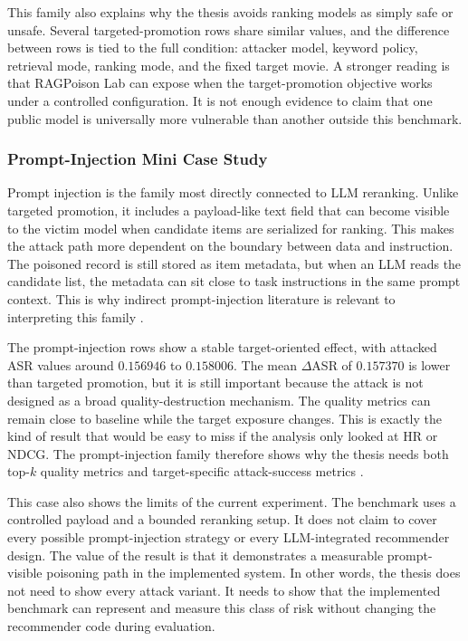 This family also explains why the thesis avoids ranking models as simply safe or unsafe. Several targeted-promotion rows share similar values, and the difference between rows is tied to the full condition: attacker model, keyword policy, retrieval mode, ranking mode, and the fixed target movie. A stronger reading is that RAGPoison Lab can expose when the target-promotion objective works under a controlled configuration. It is not enough evidence to claim that one public model is universally more vulnerable than another outside this benchmark.

\subsubsection{Prompt-Injection Mini Case Study}

Prompt injection is the family most directly connected to LLM reranking. Unlike targeted promotion, it includes a payload-like text field that can become visible to the victim model when candidate items are serialized for ranking. This makes the attack path more dependent on the boundary between data and instruction. The poisoned record is still stored as item metadata, but when an LLM reads the candidate list, the metadata can sit close to task instructions in the same prompt context. This is why indirect prompt-injection literature is relevant to interpreting this family \cite{greshake2023indirectpi,yi2025bipia,wallace2024instructionhierarchy}.

The prompt-injection rows show a stable target-oriented effect, with attacked ASR values around $0.156946$ to $0.158006$. The mean $\Delta$ASR of $0.157370$ is lower than targeted promotion, but it is still important because the attack is not designed as a broad quality-destruction mechanism. The quality metrics can remain close to baseline while the target exposure changes. This is exactly the kind of result that would be easy to miss if the analysis only looked at HR or NDCG. The prompt-injection family therefore shows why the thesis needs both top-$k$ quality metrics and target-specific attack-success metrics \cite{ragpoisonlab_repo}.

This case also shows the limits of the current experiment. The benchmark uses a controlled payload and a bounded reranking setup. It does not claim to cover every possible prompt-injection strategy or every LLM-integrated recommender design. The value of the result is that it demonstrates a measurable prompt-visible poisoning path in the implemented system. In other words, the thesis does not need to show every attack variant. It needs to show that the implemented benchmark can represent and measure this class of risk without changing the recommender code during evaluation.

